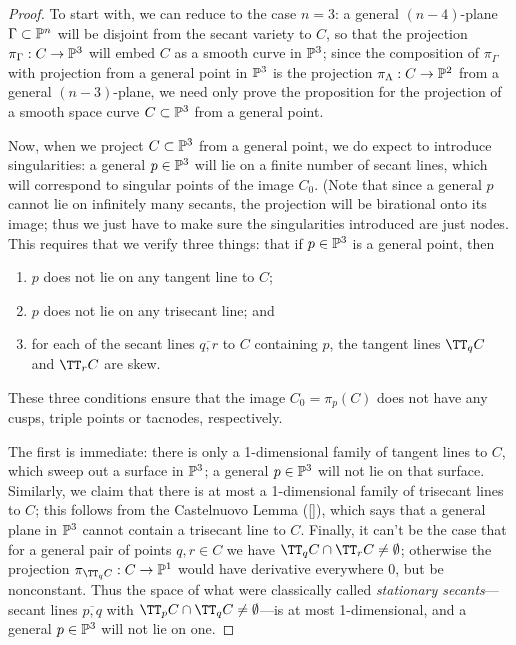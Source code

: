 \begin{proof}
To start with, we can reduce to the case $n=3$: a general $(n-4)$-plane $\Gamma \subset \PP^n$ will be disjoint from the secant variety to $C$, so that the projection $\pi_\Gamma : C \to \PP^3$ will embed $C$ as a smooth curve in $\PP^3$; since the composition of $\pi_\Gamma$ with projection from a general point in $\PP^3$ is the projection $\pi_\Lambda : C \to \PP^2$ from a general $(n-3)$-plane, we need only prove the proposition for the projection of a smooth space curve $C \subset \PP^3$ from a general point.

Now, when we project $C \subset \PP^3$ from a general point, we do expect to introduce singularities: a general $p \in \PP^3$ will lie on a finite number of secant lines, which will correspond to singular points of the image $C_0$. (Note that since a general $p$ cannot lie on infinitely many secants, the projection will be birational onto its image; thus we just have to make sure the singularities introduced are just nodes. This requires that we verify three things: that if $p \in \PP^3$ is a general point, then
\begin{enumerate}
\item $p$ does not lie on any tangent line to $C$;
\item $p$ does not lie on any trisecant line; and
\item for each of the secant lines $\overline{q,r}$ to $C$ containing $p$, the tangent lines $\TT_qC$ and $\TT_rC$ are skew.
\end{enumerate}
These three conditions ensure that the image $C_0 = \pi_p(C)$ does not have any cusps, triple points or tacnodes, respectively.

The first is immediate: there is only a 1-dimensional family of tangent lines to $C$, which sweep out a surface in $\PP^3$; a general $p \in \PP^3$ will not lie on that surface. Similarly, we claim that there is at most a 1-dimensional family of trisecant lines to $C$; this follows from the Castelnuovo Lemma (\ref{}), which says that a general plane in $\PP^3$ cannot contain a trisecant line to $C$. Finally, it can't be the case that for a general pair of points $q, r \in C$ we have $\TT_qC \cap \TT_rC \neq \emptyset$; otherwise the projection $\pi_{\TT_qC} : C \to \PP^1$ would have derivative everywhere 0, but be nonconstant. Thus the space of what were classically called \emph{stationary secants}---secant lines $\overline{p,q}$ with $\TT_pC \cap \TT_qC \neq \emptyset$---is at most 1-dimensional, and a general $p \in \PP^3$ will not lie on one.
\end{proof}

